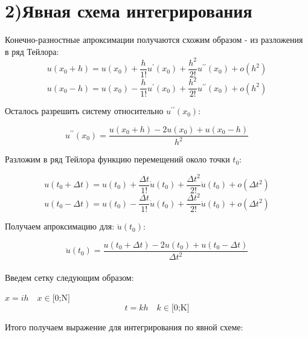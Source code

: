\documentclass[]{article}
\begin{document}
	\section*{2)Явная схема интегрирования}
		Конечно-разностные апроксимации получаются схожим образом - из разложения в ряд Тейлора:\\
		\[u(x_0 + h) = u(x_0) + \frac{h}{1!} u^\prime (x_0) + \frac{h^2}{2!}   u^{\prime \prime} (x_0) + o(h^2)\]
		\[
		u(x_0 - h) = u(x_0) - \frac{h}{1!} u^\prime (x_0) + \frac{h^2}{2!} u^{\prime \prime} (x_0) + o(h^2)
		\]
		\begin{center}
			Осталось разрешить систему относительно $u^{\prime \prime} (x_0)$:
		\end{center}
		\[
		u^{\prime \prime} (x_0) = \frac{u(x_0 + h) - 2u(x_0) + u(x_0 -h)}{h^2}
		\]
		\begin{center}
		Разложим в ряд Тейлора функцию перемещений около точки $t_0$:
		\end{center}
		\[
		u(t_0 + \Delta t) = u(t_0) + \frac{\Delta t}{1!} \dot{u} (t_0) + \frac{\Delta t^2}{2!} \ddot{u} (t_0) + o(\Delta t^2)
		\]
		\[
		u(t_0 - \Delta t) = u(t_0) - \frac{\Delta t}{1!} \dot{u} (t_0) + \frac{\Delta t^2}{2!} \ddot{u} (t_0) + o(\Delta t^2)
		\]
		\begin{center}
		Получаем апроксимацию для: $\ddot{u} (t_0)$:\\
		\end{center}
		\[
		\ddot{u} (t_0) = \frac{u(t_0 + \Delta t) - 2u(t_0) + u(t_0 - \Delta t)}{\Delta t^2}
		\]\\
		Введем сетку следующим образом:
		\begin{center}
			$x=ih \quad x \in \text{[0;N]}$ 
 			\[t=kh \quad k \in \text{[0;K]}\]			
		\end{center}
		Итого получаем выражение для интегрирования по явной схеме:\\
		\begin{center}
		\end{center}
\end{document}
